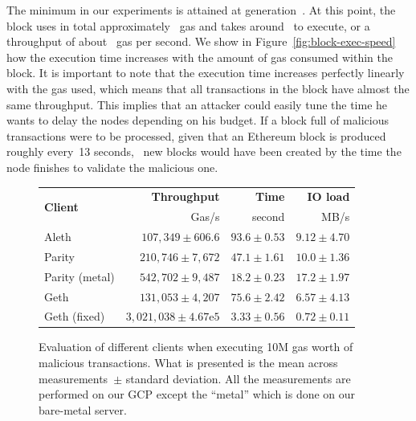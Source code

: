 The minimum in our experiments is attained at generation~. At this point, the block uses in total approximately~ gas and takes around~ to execute, or a throughput of about~ gas per second. We show in Figure~\ref{fig:block-exec-speed} how the execution time increases with the amount of gas consumed within the block. It is important to note that the execution time increases perfectly linearly with the gas used, which means that all transactions in the block have almost the same throughput. This implies that an attacker could easily tune the time he wants to delay the nodes depending on his budget. If a block full of malicious transactions were to be processed, given that an Ethereum block is produced roughly every~13 seconds,~ new blocks would have been created by the time the node finishes to validate the malicious one. 

\begin{figure}
  \centering
  \setlength{\tabcolsep}{3pt}
  \begin{tabular}{l r r r}
    \toprule
    \multirow{2}{*}{\textbf{Client}} & \textbf{Throughput} & \textbf{Time} & \textbf{IO load}\\
    & Gas/s & second & MB/s\\
    \midrule
    Aleth        & $107,349\pm 606.6$ & $93.6\pm 0.53$ & $9.12\pm 4.70$\\
    Parity       & $210,746\pm 7,672$ & $47.1\pm 1.61$ & $10.0\pm 1.36$\\
    Parity (\small{metal}) & $542,702\pm 9,487$ & $18.2\pm 0.23$ & $17.2\pm 1.97$\\
    Geth         & $131,053\pm 4,207$ & $75.6\pm 2.42$ & $6.57\pm 4.13$\\
    Geth (\small{fixed})  & $3,021,038 \pm 4.67\mathrm{e}5$ & $3.33 \pm 0.56$ & $0.72\pm 0.11$\\
    \bottomrule
  \end{tabular}
  \caption{Evaluation of different clients when executing 10M gas worth of malicious transactions. What is presented is the mean across  measurements~$\pm$ standard deviation. All the measurements are performed on our GCP except the ``metal'' which is done on our bare-metal server.}
  \label{tab:clients-evaluation}
\end{figure}

